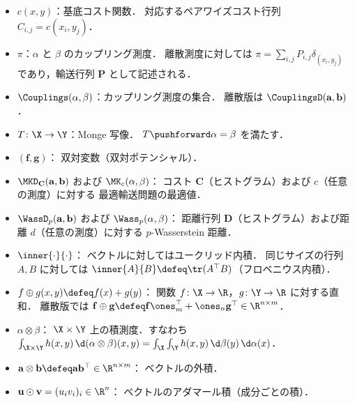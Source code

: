\begin{itemize}
  \item $c(x, y)$：基底コスト関数．
    対応するペアワイズコスト行列 $C_{i,j} = c(x_i, y_j)$．

  \item $\pi$：$\alpha$ と $\beta$ のカップリング測度．
    離散測度に対しては $\pi = \sum_{i,j} P_{i,j} \delta_{(x_i, y_j)}$
    であり，輸送行列 $\mathbf{P}$ として記述される．

  \item $\Couplings(\alpha, \beta)$：カップリング測度の集合．
    離散版は $\CouplingsD(\mathbf{a}, \mathbf{b})$．

  \item $T \colon \X \to \Y$：Monge 写像．
    $T\pushforward \alpha = \beta$ を満たす．

  \item $(\mathbf{f}, \mathbf{g})$：
    双対変数（双対ポテンシャル）．

  \item $\MKD_{\mathbf{C}}(\mathbf{a}, \mathbf{b})$
    および $\MK_c(\alpha, \beta)$：
    コスト $\mathbf{C}$（ヒストグラム）および $c$（任意の測度）に対する
    最適輸送問題の最適値．

  \item $\WassD_p(\mathbf{a}, \mathbf{b})$
    および $\Wass_p(\alpha, \beta)$：
    距離行列 $\mathbf{D}$（ヒストグラム）および距離 $d$（任意の測度）に対する
    $p$-Wasserstein 距離．

  \item $\inner{\cdot}{\cdot}$：
    ベクトルに対してはユークリッド内積．
    同じサイズの行列 $A, B$ に対しては
    $\inner{A}{B} \defeq \tr(A^\top B)$（フロベニウス内積）．

  \item $f \oplus g(x, y) \defeq f(x) + g(y)$：
    関数 $f \colon \X \to \R$，$g \colon \Y \to \R$ に対する直和．
    離散版では $\mathbf{f} \oplus \mathbf{g}
    \defeq \mathbf{f} \ones_m^\top + \ones_n \mathbf{g}^\top \in \R^{n \times m}$．

  \item $\alpha \otimes \beta$：
    $\X \times \Y$ 上の積測度．すなわち
    $\int_{\X \times \Y} h(x,y) \, \d(\alpha \otimes \beta)(x,y)
    = \int_\X \int_\Y h(x,y) \, \d\beta(y) \, \d\alpha(x)$．

  \item $\mathbf{a} \otimes \mathbf{b}
    \defeq \mathbf{a} \mathbf{b}^\top \in \R^{n \times m}$：
    ベクトルの外積．

  \item $\mathbf{u} \odot \mathbf{v}
    = (u_i v_i)_{i} \in \R^n$：
    ベクトルのアダマール積（成分ごとの積）．
\end{itemize}


